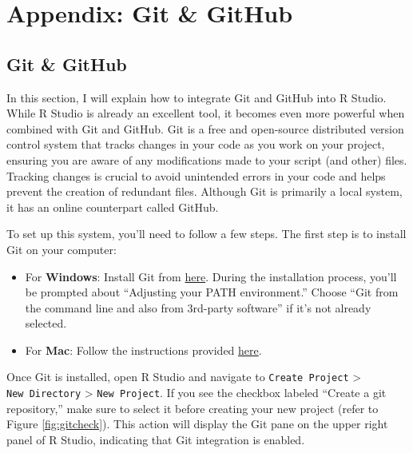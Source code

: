 \documentclass[
]{article}
\begin{document}
\hypertarget{appendix-git-github}{%
\section{Appendix: Git \& GitHub}\label{appendix-git-github}}

\hypertarget{git-github}{%
\subsection{Git \& GitHub}\label{git-github}}

In this section, I will explain how to integrate Git and GitHub into R Studio. While R Studio is already an excellent tool, it becomes even more powerful when combined with Git and GitHub. Git is a free and open-source distributed version control system that tracks changes in your code as you work on your project, ensuring you are aware of any modifications made to your script (and other) files. Tracking changes is crucial to avoid unintended errors in your code and helps prevent the creation of redundant files. Although Git is primarily a local system, it has an online counterpart called GitHub.

To set up this system, you'll need to follow a few steps. The first step is to install Git on your computer:

\begin{itemize}
\item
  For \textbf{Windows}: Install Git from \href{https://gitforwindows.org/}{here}. During the installation process, you'll be prompted about ``Adjusting your PATH environment.'' Choose ``Git from the command line and also from 3rd-party software'' if it's not already selected.
\item
  For \textbf{Mac}: Follow the instructions provided \href{https://happygitwithr.com/install-git.html}{here}.
\end{itemize}

Once Git is installed, open R Studio and navigate to \texttt{Create\ Project} \textgreater{} \texttt{New\ Directory} \textgreater{} \texttt{New\ Project}. If you see the checkbox labeled ``Create a git repository,'' make sure to select it before creating your new project (refer to Figure \ref{fig:gitcheck}). This action will display the Git pane on the upper right panel of R Studio, indicating that Git integration is enabled.
\end{document}
